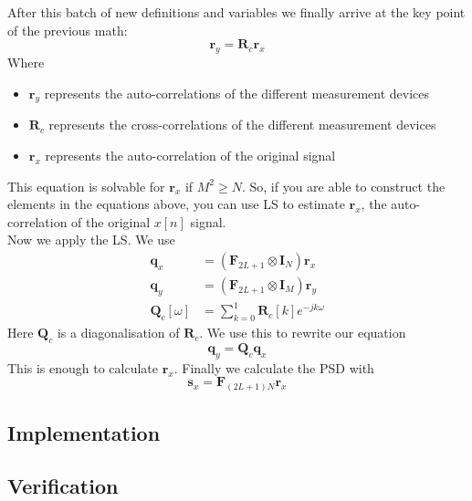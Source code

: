 \documentclass[report, oneside, a4paper, openany]{memoir}
\begin{document}
After this batch of new definitions and variables we finally arrive at the key point of the previous math:
$$
\mathbf{r}_y = \mathbf{R}_c\mathbf{r}_x
$$ 
Where
\begin{itemize}
\item $\mathbf{r}_y$ represents the auto-correlations of the different measurement devices
\item $\mathbf{R}_c$ represents the cross-correlations of the different measurement devices 
\item $\mathbf{r}_x$ represents the auto-correlation of the original signal
\end{itemize}
This equation is solvable for $\mathbf{r}_x$ if $M^2\geq N$. So, if you are able to construct the elements in the equations above, you can use LS to estimate $\mathbf{r}_x$, the auto-correlation of the original $x[n]$ signal.\\
Now we apply the LS. We use
\begin{equation*}
\begin{split}
\mathbf{q}_x &= (\mathbf{F}_{2L+1}\otimes \mathbf{I}_N)\mathbf{r}_x \\
\mathbf{q}_y &= (\mathbf{F}_{2L+1}\otimes \mathbf{I}_M)\mathbf{r}_y \\
\mathbf{Q}_c[\omega] &= \sum_{k=0}^1\mathbf{R}_c[k]e^{-jk\omega}
\end{split}
\end{equation*}
Here $\mathbf{Q}_c$ is a diagonalisation of $\mathbf{R}_c$. We use this to rewrite our equation
$$
\mathbf{q}_y = \mathbf{Q}_c\mathbf{q}_x
$$
This is enough to calculate $\mathbf{r}_x$. Finally we calculate the PSD with
$$
\mathbf{s}_x = \mathbf{F}_{(2L+1)N}\mathbf{r}_x
$$ 



\subsection{Implementation}

\subsection{Verification}
\end{document}
